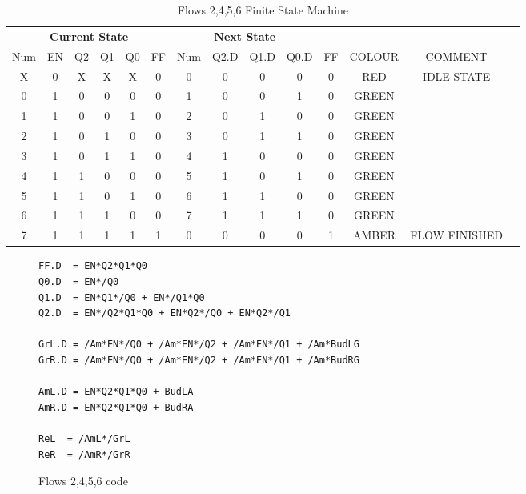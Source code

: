 \begin{table*}
\begin{tabularx}{\linewidth}{ c c c c c c | c c c c c | c c X}
  \multicolumn{6}{c|}{\textbf{Current State}} & \multicolumn{4}{c}{\textbf{Next State}} & & \\
  Num & EN & Q2 & Q1 & Q0 & FF & Num & Q2.D & Q1.D & Q0.D & FF & COLOUR & COMMENT \\ \hline 
    X &  0 &  X &  X &  X &  0 &   0 &    0 &    0 &    0 &  0 & RED    & IDLE STATE \\
    0 &  1 &  0 &  0 &  0 &  0 &   1 &    0 &    0 &    1 &  0 & GREEN  &  \\
    1 &  1 &  0 &  0 &  1 &  0 &   2 &    0 &    1 &    0 &  0 & GREEN  &  \\
    2 &  1 &  0 &  1 &  0 &  0 &   3 &    0 &    1 &    1 &  0 & GREEN  &  \\
    3 &  1 &  0 &  1 &  1 &  0 &   4 &    1 &    0 &    0 &  0 & GREEN  &  \\
    4 &  1 &  1 &  0 &  0 &  0 &   5 &    1 &    0 &    1 &  0 & GREEN  &  \\
    5 &  1 &  1 &  0 &  1 &  0 &   6 &    1 &    1 &    0 &  0 & GREEN  &  \\
    6 &  1 &  1 &  1 &  0 &  0 &   7 &    1 &    1 &    1 &  0 & GREEN  &  \\
    7 &  1 &  1 &  1 &  1 &  1 &   0 &    0 &    0 &    0 &  1 & AMBER  & FLOW FINISHED \\
  \end{tabularx}
\caption{Flows 2,4,5,6 Finite State Machine}
\label{tab:F2456sm}
\end{table*}

\begin{figure*}
\begin{lstlisting}
FF.D  = EN*Q2*Q1*Q0
Q0.D  = EN*/Q0
Q1.D  = EN*Q1*/Q0 + EN*/Q1*Q0
Q2.D  = EN*/Q2*Q1*Q0 + EN*Q2*/Q0 + EN*Q2*/Q1

GrL.D = /Am*EN*/Q0 + /Am*EN*/Q2 + /Am*EN*/Q1 + /Am*BudLG
GrR.D = /Am*EN*/Q0 + /Am*EN*/Q2 + /Am*EN*/Q1 + /Am*BudRG
  
AmL.D = EN*Q2*Q1*Q0 + BudLA
AmR.D = EN*Q2*Q1*Q0 + BudRA
 
ReL  = /AmL*/GrL
ReR  = /AmR*/GrR
\end{lstlisting}
\caption{Flows 2,4,5,6 code}
\label{lst:F2456}
\end{figure*}


